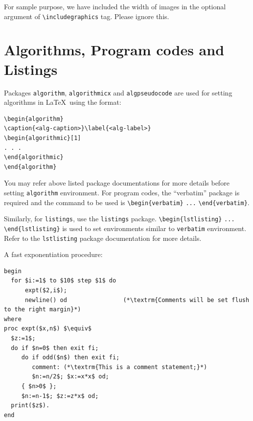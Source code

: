 \documentclass[sn-nature]{sn-jnl}%
\theoremstyle{thmstyleone}%
\theoremstyle{thmstyletwo}%
\theoremstyle{thmstylethree}%
\begin{document}
For sample purpose, we have included the width of images in the optional argument of \verb+\includegraphics+ tag. Please ignore this. 

\section{Algorithms, Program codes and Listings}\label{sec7}

Packages \verb+algorithm+, \verb+algorithmicx+ and \verb+algpseudocode+ are used for setting algorithms in \LaTeX\ using the format:

\bigskip
\begin{verbatim}
\begin{algorithm}
\caption{<alg-caption>}\label{<alg-label>}
\begin{algorithmic}[1]
. . .
\end{algorithmic}
\end{algorithm}
\end{verbatim}
\bigskip

You may refer above listed package documentations for more details before setting \verb+algorithm+ environment. For program codes, the ``verbatim'' package is required and the command to be used is \verb+\begin{verbatim}+ \verb+...+ \verb+\end{verbatim}+. 

Similarly, for \verb+listings+, use the \verb+listings+ package. \verb+\begin{lstlisting}+ \verb+...+ \verb+\end{lstlisting}+ is used to set environments similar to \verb+verbatim+ environment. Refer to the \verb+lstlisting+ package documentation for more details.

A fast exponentiation procedure:

\begin{lstlisting}
begin
  for $i:=1$ to $10$ step $1$ do
      expt($2,i$);  
      newline() od                (*\textrm{Comments will be set flush to the right margin}*)
where
proc expt($x,n$) $\equiv$
  $z:=1$;
  do if $n=0$ then exit fi;
     do if odd($n$) then exit fi;                 
        comment: (*\textrm{This is a comment statement;}*)
        $n:=n/2$; $x:=x*x$ od;
     { $n>0$ };
     $n:=n-1$; $z:=z*x$ od;
  print($z$). 
end
\end{lstlisting}
\end{document}
